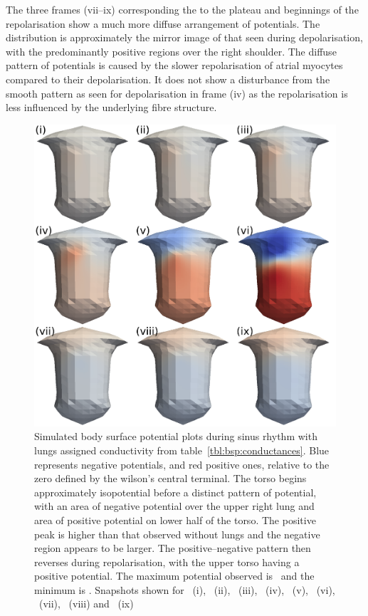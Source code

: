 The three frames (vii--ix) corresponding the to the plateau and beginnings of the
repolarisation show a much more diffuse arrangement of potentials.
The distribution is approximately the mirror image of that seen during
depolarisation, with the predominantly positive regions over the right shoulder.
The diffuse pattern of potentials is caused by the slower repolarisation of
atrial myocytes compared to their depolarisation.
It does not show a disturbance from the smooth pattern as seen for
depolarisation in frame (iv) as the repolarisation is less influenced by the
underlying fibre structure.


\begin{figure}
\includegraphics{figures/bsp/bsp_lungs}
\caption[Body Surface Potential snapshots, with lungs]{
\label{bsp:fig:lungs_bsp}
Simulated body surface potential plots during sinus rhythm with lungs assigned
conductivity from table~\ref{tbl:bsp:conductances}.
Blue represents negative potentials, and red positive ones, relative to the zero
defined by the wilson's central terminal.
The torso begins approximately isopotential before a distinct pattern of
potential, with an area of negative potential over the upper right lung and
area of positive potential on lower half of the torso.
The positive peak is higher than that observed without lungs and the negative
region appears to be larger.
The positive--negative pattern then reverses during repolarisation, with the
upper torso having a positive potential.
The maximum potential observed is \ and the minimum is .
Snapshots shown for \ (i), \ (ii), \ (iii), \ (iv),
\ (v), \ (vi), \ (vii), \ (viii) and \
(ix)
}
\end{figure}

